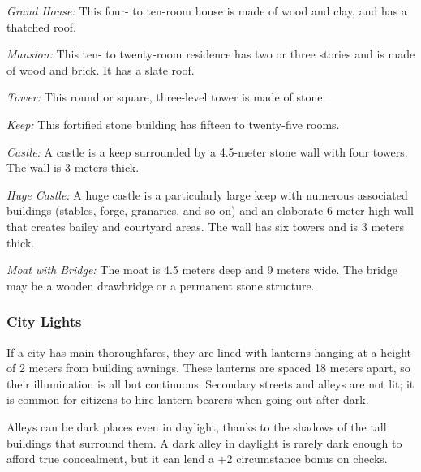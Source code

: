 \textit{Grand House:} This four- to ten-room house is made of wood and clay, and has a thatched roof.

\textit{Mansion:} This ten- to twenty-room residence has two or three stories and is made of wood and brick. It has a slate roof.

\textit{Tower:} This round or square, three-level tower is made of stone.

\textit{Keep:} This fortified stone building has fifteen to twenty-five rooms.

\textit{Castle:} A castle is a keep surrounded by a 4.5-meter stone wall with four towers. The wall is 3 meters thick.

\textit{Huge Castle:} A huge castle is a particularly large keep with numerous associated buildings (stables, forge, granaries, and so on) and an elaborate 6-meter-high wall that creates bailey and courtyard areas. The wall has six towers and is 3 meters thick.

\textit{Moat with Bridge:} The moat is 4.5 meters deep and 9 meters wide. The bridge may be a wooden drawbridge or a permanent stone structure.

\subsubsection{City Lights}
If a city has main thoroughfares, they are lined with lanterns hanging at a height of 2 meters from building awnings. These lanterns are spaced 18 meters apart, so their illumination is all but continuous. Secondary streets and alleys are not lit; it is common for citizens to hire lantern-bearers when going out after dark.

Alleys can be dark places even in daylight, thanks to the shadows of the tall buildings that surround them. A dark alley in daylight is rarely dark enough to afford true concealment, but it can lend a +2 circumstance bonus on  checks.
